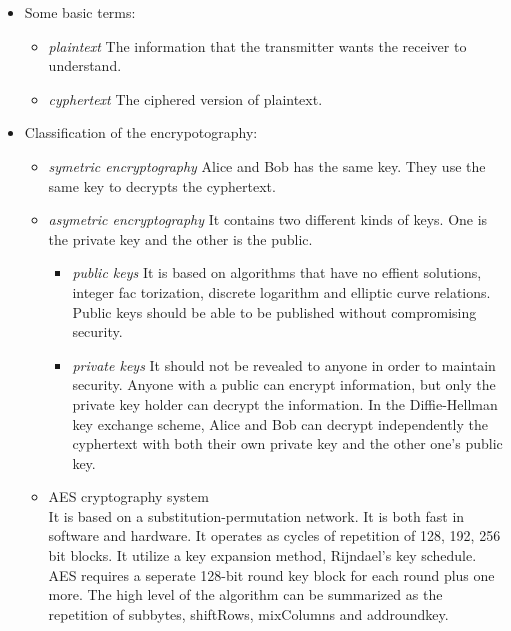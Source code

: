 \documentclass[]{article}
\begin{document}
            \begin{itemize}
                \item Some basic terms:
                \begin{itemize}
                    \item \textit{plaintext} The information that the transmitter wants the receiver to understand.
                    \item \textit{cyphertext} The ciphered version of plaintext.
                \end{itemize}
                
                \item Classification of the encrypotography:
                \begin{itemize}
                    \item \textit{symetric encryptography} Alice and Bob has the same key. They use the same key to decrypts
                    the cyphertext.
                    \item \textit{asymetric encryptography} It contains two different kinds of keys. One is the private key
                    and the other is the public.
                        \begin{itemize}
                            \item \textit{public keys} It is based on algorithms that have no effient solutions, integer fac
                            torization, discrete logarithm and elliptic curve relations. Public keys should be able to be
                            published without compromising security.
                            \item \textit{private keys} It should not be revealed to anyone in order to maintain security. 
                            Anyone with a public can encrypt information, but only the private key holder can decrypt the 
                            information. In the Diffie-Hellman key exchange scheme, Alice and Bob can decrypt independently 
                            the cyphertext with both their own private key and the other one's public key.
                        \end{itemize}
                \item AES cryptography system\\

                    It is based on a substitution-permutation network. It is both fast in software and hardware. It operates as
                    cycles of repetition of 128, 192, 256 bit blocks. It utilize a key expansion method, Rijndael's key schedule.
                    AES requires a seperate 128-bit round key block for each round plus one more. The high level of the algorithm
                    can be summarized as the repetition of subbytes, shiftRows, mixColumns and addroundkey.


\end{itemize}
\end{itemize}
\end{document}
